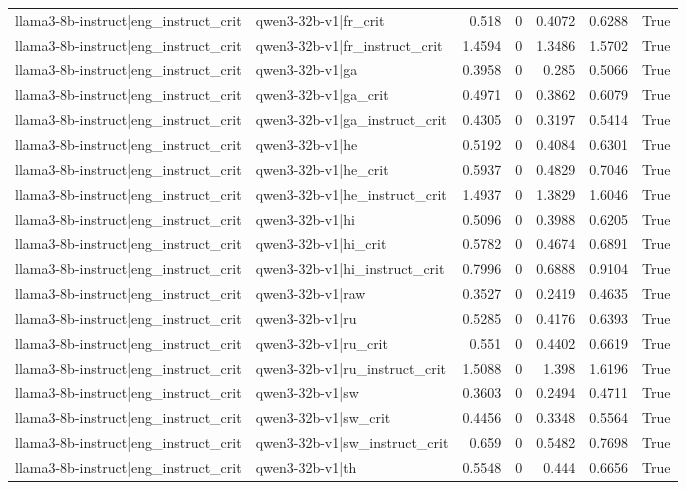 \begin{table}
\begin{tabular}{l l r r r r l}
llama3-8b-instruct|eng_instruct_crit & qwen3-32b-v1|fr_crit & 0.518 & 0 & 0.4072 & 0.6288 & True \\
llama3-8b-instruct|eng_instruct_crit & qwen3-32b-v1|fr_instruct_crit & 1.4594 & 0 & 1.3486 & 1.5702 & True \\
llama3-8b-instruct|eng_instruct_crit & qwen3-32b-v1|ga & 0.3958 & 0 & 0.285 & 0.5066 & True \\
llama3-8b-instruct|eng_instruct_crit & qwen3-32b-v1|ga_crit & 0.4971 & 0 & 0.3862 & 0.6079 & True \\
llama3-8b-instruct|eng_instruct_crit & qwen3-32b-v1|ga_instruct_crit & 0.4305 & 0 & 0.3197 & 0.5414 & True \\
llama3-8b-instruct|eng_instruct_crit & qwen3-32b-v1|he & 0.5192 & 0 & 0.4084 & 0.6301 & True \\
llama3-8b-instruct|eng_instruct_crit & qwen3-32b-v1|he_crit & 0.5937 & 0 & 0.4829 & 0.7046 & True \\
llama3-8b-instruct|eng_instruct_crit & qwen3-32b-v1|he_instruct_crit & 1.4937 & 0 & 1.3829 & 1.6046 & True \\
llama3-8b-instruct|eng_instruct_crit & qwen3-32b-v1|hi & 0.5096 & 0 & 0.3988 & 0.6205 & True \\
llama3-8b-instruct|eng_instruct_crit & qwen3-32b-v1|hi_crit & 0.5782 & 0 & 0.4674 & 0.6891 & True \\
llama3-8b-instruct|eng_instruct_crit & qwen3-32b-v1|hi_instruct_crit & 0.7996 & 0 & 0.6888 & 0.9104 & True \\
llama3-8b-instruct|eng_instruct_crit & qwen3-32b-v1|raw & 0.3527 & 0 & 0.2419 & 0.4635 & True \\
llama3-8b-instruct|eng_instruct_crit & qwen3-32b-v1|ru & 0.5285 & 0 & 0.4176 & 0.6393 & True \\
llama3-8b-instruct|eng_instruct_crit & qwen3-32b-v1|ru_crit & 0.551 & 0 & 0.4402 & 0.6619 & True \\
llama3-8b-instruct|eng_instruct_crit & qwen3-32b-v1|ru_instruct_crit & 1.5088 & 0 & 1.398 & 1.6196 & True \\
llama3-8b-instruct|eng_instruct_crit & qwen3-32b-v1|sw & 0.3603 & 0 & 0.2494 & 0.4711 & True \\
llama3-8b-instruct|eng_instruct_crit & qwen3-32b-v1|sw_crit & 0.4456 & 0 & 0.3348 & 0.5564 & True \\
llama3-8b-instruct|eng_instruct_crit & qwen3-32b-v1|sw_instruct_crit & 0.659 & 0 & 0.5482 & 0.7698 & True \\
llama3-8b-instruct|eng_instruct_crit & qwen3-32b-v1|th & 0.5548 & 0 & 0.444 & 0.6656 & True \\

\end{tabular}
\end{table}
